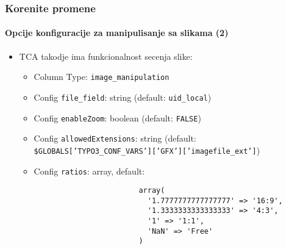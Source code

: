 \begin{frame}[fragile]
	\frametitle{Korenite promene}
	\framesubtitle{Opcije konfiguracije za manipulisanje sa slikama (2)}

	\lstset{basicstyle=\smaller\ttfamily}

	\begin{itemize}
		\item TCA takodje ima funkcionalnost secenja slike:

			\begin{itemize}
				\item Column Type: \texttt{image\_manipulation}
				\item Config \texttt{file\_field}: string	\tabto{5.6cm}(default: \texttt{uid\_local})
				\item Config \texttt{enableZoom}: boolean	\tabto{5.6cm}(default: \texttt{FALSE})
				\item Config \texttt{allowedExtensions}: string\newline
					(default: \smaller\texttt{\$GLOBALS['TYPO3\_CONF\_VARS']['GFX']['imagefile\_ext']}\small)
				\item Config \texttt{ratios}: array, default:

					\begin{lstlisting}
						array(
						  '1.7777777777777777' => '16:9',
						  '1.3333333333333333' => '4:3',
						  '1' => '1:1',
						  'NaN' => 'Free'
						)
					\end{lstlisting}
			\end{itemize}

	\end{itemize}

\end{frame}

